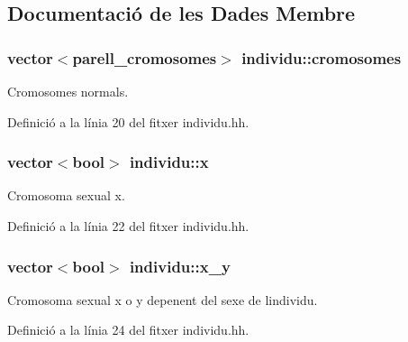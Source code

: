 \subsection{Documentació de les Dades Membre}
\subsubsection[{\texorpdfstring{cromosomes}{cromosomes}}]{\setlength{\rightskip}{0pt plus 5cm}vector$<${\bf parell\+\_\+cromosomes}$>$ individu\+::cromosomes\hspace{0.3cm}{\ttfamily [private]}}\hypertarget{classindividu_ae5e0a83ff9e943cbcdf95b74069ad3a7}{}\label{classindividu_ae5e0a83ff9e943cbcdf95b74069ad3a7}


Cromosomes normals. 



Definició a la línia 20 del fitxer individu.\+hh.

\subsubsection[{\texorpdfstring{x}{x}}]{\setlength{\rightskip}{0pt plus 5cm}vector$<$bool$>$ individu\+::x\hspace{0.3cm}{\ttfamily [private]}}\hypertarget{classindividu_a3c4abda8daead156b5519f69bd224fa9}{}\label{classindividu_a3c4abda8daead156b5519f69bd224fa9}


Cromosoma sexual x. 



Definició a la línia 22 del fitxer individu.\+hh.

\subsubsection[{\texorpdfstring{x\+\_\+y}{x_y}}]{\setlength{\rightskip}{0pt plus 5cm}vector$<$bool$>$ individu\+::x\+\_\+y\hspace{0.3cm}{\ttfamily [private]}}\hypertarget{classindividu_a51eb7827fdd5bd5302e3c962fd719fc0}{}\label{classindividu_a51eb7827fdd5bd5302e3c962fd719fc0}


Cromosoma sexual x o y depenent del sexe de l\textquotesingle{}individu. 



Definició a la línia 24 del fitxer individu.\+hh.


